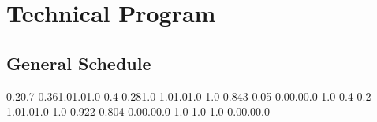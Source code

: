 \titleformat{\chapter}{\bf \huge}{\thechapter}{1cm}{}
\chapter{Technical Program}
\vspace{-15mm}
 \section{General Schedule}


  {0.2}{0.7} {0.36}{1.0}{1.0}{1.0}
   {0.4} {0.28}{1.0} {1.0}{1.0}{1.0}
      {1.0} {0.843} {0.05} {0.0}{0.0}{0.0}
 {1.0} {0.4} {0.2} {1.0}{1.0}{1.0}
   {1.0} {0.922} {0.804} {0.0}{0.0}{0.0}
   {1.0} {1.0} {1.0} {0.0}{0.0}{0.0}


\newcommand{\WorkshopsSchedule}[2]{
  \event #1 {0900} {1030} {09:00\\\vspace{0.2em}Workshops #2}        {90~min}                {Wheeler Hall}                   {workshop}
  \event #1 {1030} {1100} {10:30 Break}                              {\vspace{1.5mm}30 min}  {Wheeler Hall}     {break}
  \event #1 {1100} {1230} {11:00\\\vspace{0.2em}Workshops #2}        {90~min}                {Wheeler Hall}                   {workshop}
  \event #1 {1400} {1530} {14:00\\\vspace{0.2em}Workshops #2}        {90~min}                {Wheeler Hall}                   {workshop}
  \event #1 {1530} {1600} {15:30 Break}                              {\vspace{1.5mm}30 min}  {Wheeler Hall}     {break}
  \event #1 {1600} {1730} {16:00\\\vspace{0.2em}Workshops #2}        {90~min}                {Wheeler Hall}                   {workshop}
}

